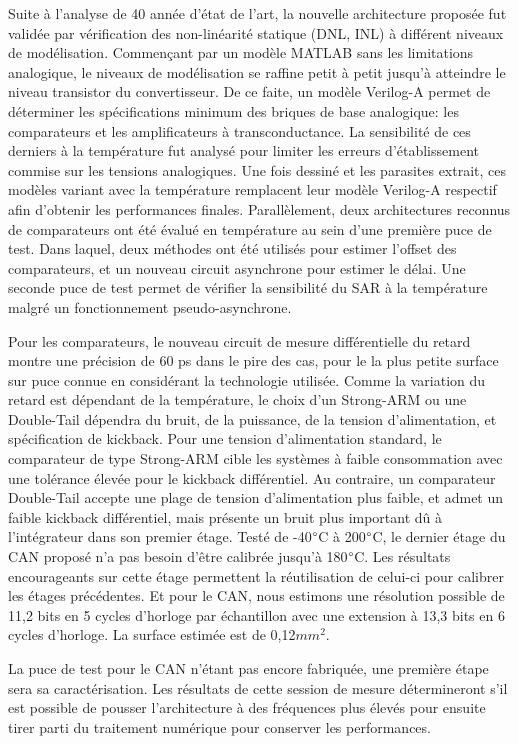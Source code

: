 \begin{mdframed}[linecolor=Prune,linewidth=1]
\begin{small}
\begin{multicols}{2}
Suite à l'analyse de 40 année d'état de l'art, la nouvelle architecture proposée fut validée par vérification des non-linéarité statique (DNL, INL) à différent niveaux de modélisation. Commençant par un modèle MATLAB sans les limitations analogique, le niveaux de modélisation se raffine petit à petit jusqu'à atteindre le niveau transistor du convertisseur. De ce faite, un modèle Verilog-A permet de déterminer les spécifications minimum des briques de base analogique: les comparateurs et les amplificateurs à transconductance. La sensibilité de ces derniers à la température fut analysé pour limiter les erreurs d'établissement commise sur les tensions analogiques. Une fois dessiné et les parasites extrait, ces modèles variant avec la température remplacent leur modèle Verilog-A respectif afin d'obtenir les performances finales. Parallèlement, deux architectures reconnus de comparateurs ont été évalué en température au sein d'une première puce de test. Dans laquel, deux méthodes ont été utilisés pour estimer l'offset des comparateurs, et un nouveau circuit asynchrone pour estimer le délai. Une seconde puce de test permet de vérifier la sensibilité du SAR à la température malgré un fonctionnement pseudo-asynchrone.

Pour les comparateurs, le nouveau circuit de mesure différentielle du retard montre une précision de 60 ps dans le pire des cas, pour le la plus petite surface sur puce connue en considérant la technologie utilisée. Comme la variation du retard est dépendant de la température, le choix d'un Strong-ARM ou une Double-Tail dépendra du bruit, de la puissance, de la tension d'alimentation, et spécification de kickback. Pour une tension d'alimentation standard, le comparateur de type Strong-ARM cible les systèmes à faible consommation avec une tolérance élevée pour le kickback différentiel. Au contraire, un comparateur Double-Tail accepte une plage de tension d'alimentation plus faible, et admet un faible kickback différentiel, mais présente un bruit plus important dû à l'intégrateur dans son premier étage. Testé de -40\(\degree \)C à 200\(\degree \)C, le dernier étage du CAN proposé n'a pas besoin d'être calibrée jusqu'à 180\(\degree \)C. Les résultats encourageants sur cette étage permettent la réutilisation de celui-ci pour calibrer les étages précédentes. Et pour le CAN, nous estimons une résolution possible de 11,2 bits en 5 cycles d'horloge par échantillon avec une extension à 13,3 bits en 6 cycles d'horloge. La surface estimée est de 0,12$mm^2$.

La puce de test pour le CAN n'étant pas encore fabriquée, une première étape sera sa caractérisation. Les résultats de cette session de mesure détermineront s'il est possible de pousser l'architecture à des fréquences plus élevés pour ensuite tirer parti du traitement numérique pour conserver les performances.
\end{multicols}
\end{small}
\end{mdframed}

